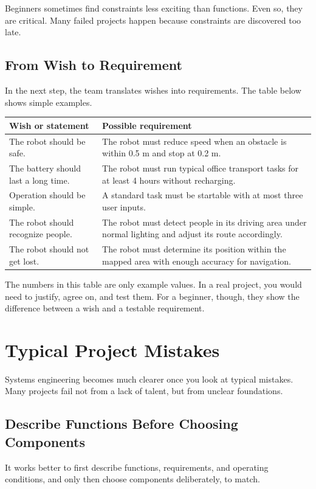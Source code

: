 Beginners sometimes find constraints less exciting than functions. Even so, they are critical. Many failed projects happen because constraints are discovered too late.

\subsection{From Wish to Requirement}
In the next step, the team translates wishes into requirements. The table below shows simple examples.

\begin{center}
\begin{tabular}{p{}p{}}
\toprule
\textbf{Wish or statement} & \textbf{Possible requirement} \\
\midrule
The robot should be safe. & The robot must reduce speed when an obstacle is within 0.5 m and stop at 0.2 m. \\
The battery should last a long time. & The robot must run typical office transport tasks for at least 4 hours without recharging. \\
Operation should be simple. & A standard task must be startable with at most three user inputs. \\
The robot should recognize people. & The robot must detect people in its driving area under normal lighting and adjust its route accordingly. \\
The robot should not get lost. & The robot must determine its position within the mapped area with enough accuracy for navigation. \\
\bottomrule
\end{tabular}
\end{center}

The numbers in this table are only example values. In a real project, you would need to justify, agree on, and test them. For a beginner, though, they show the difference between a wish and a testable requirement.

\section{Typical Project Mistakes}
Systems engineering becomes much clearer once you look at typical mistakes. Many projects fail not from a lack of talent, but from unclear foundations.

\subsection{Describe Functions Before Choosing Components}
It works better to first describe functions, requirements, and operating conditions, and only then choose components deliberately, to match.

